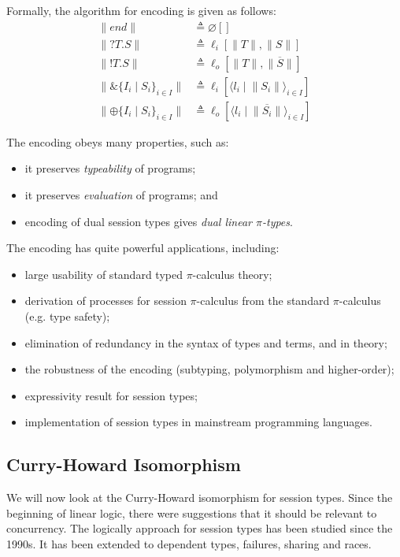 \documentclass[a4paper, openany]{memoir}
\theoremstyle{definition}
\begin{document}
    Formally, the algorithm for encoding is given as follows:
    \begin{align*}
        \lVert \textit{end} \rVert &\triangleq \varnothing[] \\
        \lVert ?T.S \rVert &\triangleq \ell_i[\lVert T \rVert, \lVert S\rVert] \\
        \lVert !T.S \rVert &\triangleq \ell_o[\lVert T\rVert, \lVert\overline{S}\rVert] \\
        \lVert \& \{I_i \mid S_i\}_{i \in I} \rVert &\triangleq \ell_i[\langle l_i \mid \lVert S_i \rVert \rangle_{i \in I}] \\
        \lVert \oplus \{I_i \mid S_i\}_{i \in I} \rVert &\triangleq \ell_o[\langle l_i \mid \lVert \overline{S_i}\rVert \rangle_{i \in I}]
    \end{align*}
    
    The encoding obeys many properties, such as:
    \begin{itemize}
        \item it preserves \emph{typeability} of programs;
        \item it preserves \emph{evaluation} of programs; and
        \item encoding of dual session types gives \emph{dual linear $\pi$-types}.
    \end{itemize}

    The encoding has quite powerful applications, including:
    \begin{itemize}
        \item large usability of standard typed $\pi$-calculus theory;
        \item derivation of processes for session $\pi$-calculus from the standard $\pi$-calculus (e.g. type safety);
        \item elimination of redundancy in the syntax of types and terms, and in theory;
        \item the robustness of the encoding (subtyping, polymorphism and higher-order);
        \item expressivity result for session types;
        \item implementation of session types in mainstream programming languages.
    \end{itemize}

    \subsection{Curry-Howard Isomorphism}
    We will now look at the Curry-Howard isomorphism for session types. Since the beginning of linear logic, there were suggestions that it should be relevant to concurrency. The logically approach for session types has been studied since the 1990s. It has been extended to dependent types, failures, sharing and races.
\end{document}
